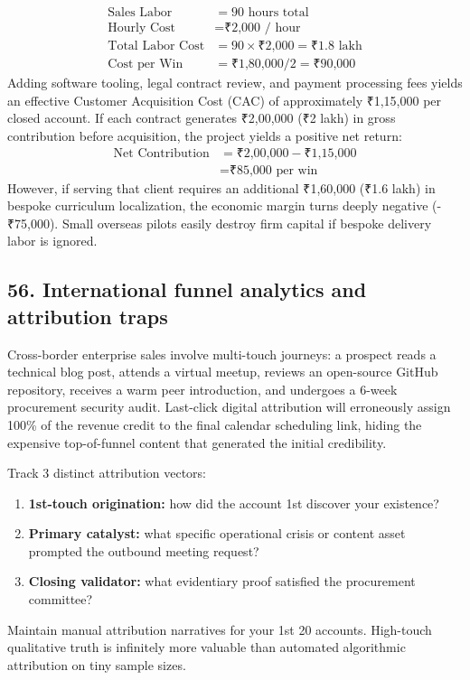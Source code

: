 \begin{align}
\text{Sales Labor} &= 90 \text{ hours total} \nonumber\\
\text{Hourly Cost} &= \text{₹2,000 / hour} \nonumber\\
\text{Total Labor Cost} &= 90 \times \text{₹2,000} = \text{₹1.8 lakh} \nonumber\\
\text{Cost per Win} &= \text{₹1,80,000} / 2 = \text{₹90,000}
\end{align}
Adding software tooling, legal contract review, and payment processing fees yields an effective Customer Acquisition Cost (CAC) of approximately ₹1,15,000 per closed account. If each contract generates ₹2,00,000 (₹2 lakh) in gross contribution before acquisition, the project yields a positive net return:
\begin{equation}
\begin{aligned}
\text{Net Contribution} &= \text{₹2,00,000} - \text{₹1,15,000} \\
&= \text{₹85,000 per win}
\end{aligned}
\end{equation}
However, if serving that client requires an additional ₹1,60,000 (₹1.6 lakh) in bespoke curriculum localization, the economic margin turns deeply negative (-₹75,000). Small overseas pilots easily destroy firm capital if bespoke delivery labor is ignored.

\subsection{56. International funnel analytics and attribution traps}

Cross-border enterprise sales involve multi-touch journeys: a prospect reads a technical blog post, attends a virtual meetup, reviews an open-source GitHub repository, receives a warm peer introduction, and undergoes a 6-week procurement security audit. Last-click digital attribution will erroneously assign 100\% of the revenue credit to the final calendar scheduling link, hiding the expensive top-of-funnel content that generated the initial credibility.

Track 3 distinct attribution vectors:
\begin{enumerate}
    \item \textbf{1st-touch origination:} how did the account 1st discover your existence?
    \item \textbf{Primary catalyst:} what specific operational crisis or content asset prompted the outbound meeting request?
    \item \textbf{Closing validator:} what evidentiary proof satisfied the procurement committee?
\end{enumerate}
Maintain manual attribution narratives for your 1st 20 accounts. High-touch qualitative truth is infinitely more valuable than automated algorithmic attribution on tiny sample sizes.

